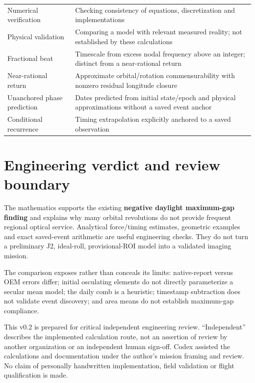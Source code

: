 \documentclass[10pt,a4paper]{article}
\numberwithin{equation}{section}
\begin{document}
\begin{longtable}{@{}>{\raggedright\arraybackslash}p{}>{\raggedright\arraybackslash}p{}@{}}
\rowcolor{rowalt}Numerical verification & Checking consistency of equations, discretization and implementations \\
Physical validation & Comparing a model with relevant measured reality; not established by these calculations \\
\rowcolor{rowalt}Fractional beat & Timescale from excess nodal frequency above an integer; distinct from a near-rational return \\
Near-rational return & Approximate orbital/rotation commensurability with nonzero residual longitude closure \\
\rowcolor{rowalt}Unanchored phase prediction & Dates predicted from initial state/epoch and physical approximations without a saved event anchor \\
Conditional recurrence & Timing extrapolation explicitly anchored to a saved observation \\
\end{longtable}\endgroup

\clearpage\section*{Engineering verdict and review boundary}

\begin{sloppypar}The mathematics supports the existing \textbf{negative daylight maximum-gap finding} and explains why many orbital revolutions do not provide frequent regional optical service. Analytical force/timing estimates, geometric examples and exact saved-event arithmetic are useful engineering checks. They do not turn a preliminary J2, ideal-roll, provisional-ROI model into a validated imaging mission.\end{sloppypar}


\begin{sloppypar}The comparison exposes rather than conceals its limits: native-report versus OEM errors differ; initial osculating elements do not directly parameterize a secular mean model; the daily comb is a heuristic; timestamp subtraction does not validate event discovery; and area means do not establish maximum-gap compliance.\end{sloppypar}


\begin{sloppypar}This v0.2 is prepared for critical independent engineering review. ``Independent'' describes the implemented calculation route, not an assertion of review by another organization or an independent human sign-off. Codex assisted the calculations and documentation under the author's mission framing and review. No claim of personally handwritten implementation, field validation or flight qualification is made.\end{sloppypar}
\end{document}
